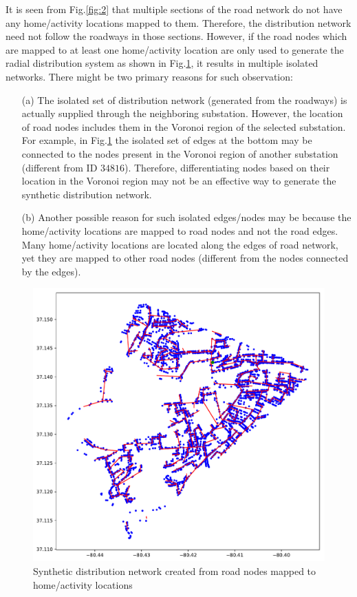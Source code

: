 \documentclass[12pt]{amsart}
\theoremstyle{definition}
\theoremstyle{remark} \newtheorem{remark}[theorem]{Remark} %
\numberwithin{equation}{section} %
\begin{document}
	It is seen from Fig.\ref{fig:2} that multiple sections of the road network do not have any home/activity locations mapped to them. Therefore, the distribution network need not follow the roadways in those sections. However, if the road nodes which are mapped to at least one home/activity location are only used to generate the radial distribution system as shown in Fig.\ref{fig:3}, it results in multiple isolated networks. There might be two primary reasons for such observation:
	\begin{enumerate}
		\item[(a)] The isolated set of distribution network (generated from the roadways) is actually supplied through the neighboring substation. However, the location of road nodes includes them in the Voronoi region of the selected substation. For example, in Fig.\ref{fig:3} the isolated set of edges at the bottom may be connected to the nodes present in the Voronoi region of another substation (different from ID $34816$). Therefore, differentiating nodes based on their location in the Voronoi region may not be an effective way to generate the synthetic distribution network.
		\item[(b)] Another possible reason for such isolated edges/nodes may be because the home/activity locations are mapped to road nodes and not the road edges. Many home/activity locations are located along the edges of road network, yet they are mapped to other road nodes (different from the nodes connected by the edges).
	\end{enumerate}
	
	\begin{figure}
		\centering
		\includegraphics[scale=0.4]{figs/fig3.pdf}
		\caption{Synthetic distribution network created from road nodes mapped to home/activity locations}
		\label{fig:3}
	\end{figure} 
	
\end{document}
